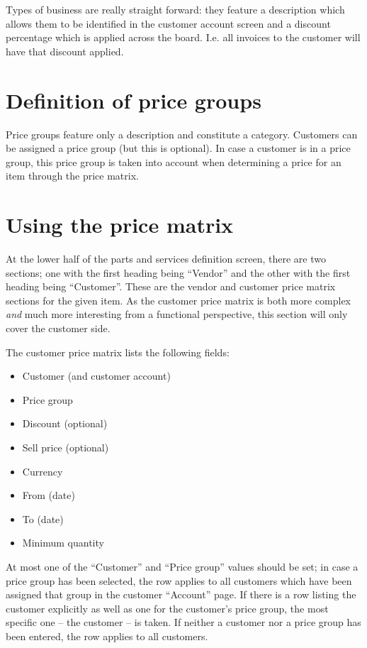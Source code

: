 Types of business are really straight forward: they feature a description
which allows them to be identified in the \gls{customer} account screen and a discount
percentage which is applied across the board. I.e. all invoices to the customer
will have that discount applied.

\section{Definition of price groups}
\label{sec-pricing-price-groups}

Price groups feature only a description and constitute a category. Customers can be assigned a price group
(but this is optional). In case a customer is in a price group, this price group is taken into account when
determining a price for an item through the price matrix.

\section{Using the price matrix}

At the lower half of the parts and services definition screen, there are two sections; one with the first
heading being ``Vendor'' and the other with the first heading being ``Customer''.  These are the vendor and
customer price matrix sections for the given item. As the customer price matrix is both more complex 
\textit{and} much more interesting from a functional perspective, this section will only cover the customer
side.

The customer price matrix lists the following fields:

\begin{itemize}
	\item Customer (and customer account)
	\item Price group
	\item Discount (optional)
	\item Sell price (optional)
	\item Currency
	\item From (date)
	\item To (date)
	\item Minimum quantity
\end{itemize}

At most one of the ``Customer'' and ``Price group'' values should be set; in case a price group has been selected,
the row applies to all customers which have been assigned that group in the customer ``Account'' page. If there
is a row listing the customer explicitly as well as one for the customer's price group, the most specific one --
the customer -- is taken. If neither a customer nor a price group has been entered, the row applies to all customers.

